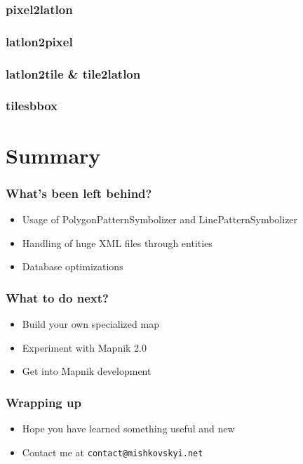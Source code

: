 \documentclass[17pt]{beamer}
\begin{document}
\begin{frame}
  \frametitle{pixel2latlon}

\end{frame}

\begin{frame}
  \frametitle{latlon2pixel}

\end{frame}

\begin{frame}
  \frametitle{latlon2tile \& tile2latlon}

\end{frame}

\begin{frame}
  \frametitle{tilesbbox}

\end{frame}

\section*{Summary}

\begin{frame}
  \frametitle{What's been left behind?}
  \begin{itemize}
  \item Usage of PolygonPatternSymbolizer and LinePatternSymbolizer
  \item Handling of huge XML files through entities
  \item Database optimizations
  \end{itemize}
\end{frame}

\begin{frame}
  \frametitle{What to do next?}
  \begin{itemize}
  \item Build your own specialized map
  \item Experiment with Mapnik 2.0
  \item Get into Mapnik development
  \end{itemize}
\end{frame}

\begin{frame}
  \frametitle{Wrapping up}
  \begin{itemize}
  \item Hope you have learned something useful and new
  \item Contact me at \texttt{contact@mishkovskyi.net}
  \end{itemize}
\end{frame}

\end{document}
